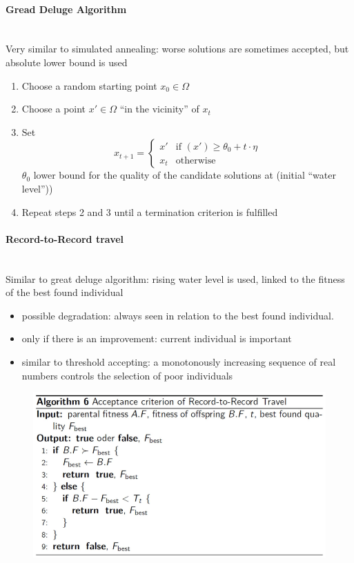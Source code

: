 \documentclass{article}
\begin{document}
\paragraph{Gread Deluge Algorithm}\mbox{}\\
Very similar to simulated annealing: worse
solutions are sometimes accepted, but absolute
lower bound is used
\begin{enumerate}
    \item Choose a random starting point $x_0\in\Omega$
    \item Choose a point $x'\in\Omega$ “in the vicinity” of $x_t$
    \item
          Set \[
              x_{t+1}=
              \begin{cases}
                  x'  & \text{if }(x')\geq\theta_0+t\cdot\eta \\
                  x_t & \text{otherwise}
              \end{cases}
          \]
          $\theta_0$ lower bound for the quality of the candidate solutions
          at (initial “water level”))
    \item Repeat steps 2 and 3 until a termination criterion is fulfilled
\end{enumerate}

\paragraph{Record-to-Record travel}\mbox{}\\
Similar to great deluge algorithm: rising water level is used, linked to the
fitness of the best found individual
\begin{itemize}
    \item possible degradation:  always seen in relation to the best found individual.
    \item only if there is an improvement: current individual is important
    \item similar to threshold accepting: a monotonously increasing sequence of real numbers controls the selection of poor individuals
\end{itemize}
\begin{figure}[H]
    \centering
    \includegraphics[scale=0.5]{images/record2record.png}
\end{figure}
\end{document}
